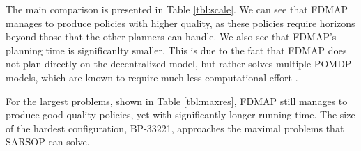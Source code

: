 \documentclass[letterpaper]{article} %
\theoremstyle{definition}
\begin{document}
\begin{table}
\centering
\scriptsize
    \caption{\label{tbl:small} Results for BP-21210. FDMAP outputs a reasonable value compared to GMAA-ICE, which optimizes the small scaled problem. The last row presents results for the maximal horizon reached on DP-JESP and GMAA-ICE, and average simulations steps until reaching the goal state for FDMAP when run for unbounded number of steps. These are specified in parentheses next to the policy value}
\end{table}


The main comparison is presented in Table \ref{tbl:scale}. We can see that FDMAP manages to produce policies with higher quality, as these policies require horizons beyond those that the other planners can handle. We also see that FDMAP's planning time is significanlty smaller.
 This is due to the fact that FDMAP does not plan directly on the decentralized model, but rather solves multiple POMDP models, which are known to require much less computational effort \cite{DECPOMDPCOMP}.

For the largest problems, shown in Table \ref{tbl:maxres}, FDMAP still manages to produce good quality policies, yet with significantly longer running time. The size of the hardest configuration, BP-33221, approaches the maximal problems that SARSOP \cite{SARSOP} can solve.
\end{document}
